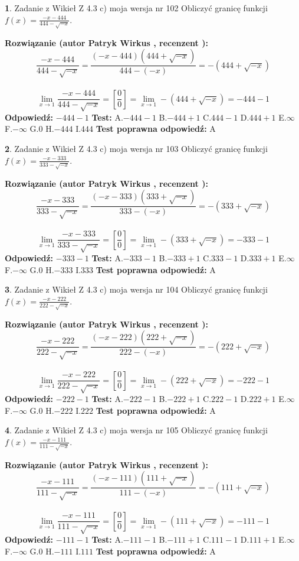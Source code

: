 \documentclass[12pt, a4paper]{article}
\theoremstyle{definition} %
\newtheorem{zad}{}
\newcommand{\zadStart}[1]{\begin{zad}#1\newline}
\newcommand{\zadStop}{\end{zad}}
\newcommand{\rozwStart}[2]{\noindent \textbf{Rozwiązanie (autor #1 , recenzent #2): }\newline}
\newcommand{\rozwStop}{\newline}
\newcommand{\odpStart}{\noindent \textbf{Odpowiedź:}\newline}
\newcommand{\odpStop}{\newline}
\newcommand{\testStart}{\noindent \textbf{Test:}\newline}
\newcommand{\testStop}{\newline}
\newcommand{\kluczStart}{\noindent \textbf{Test poprawna odpowiedź:}\newline}
\newcommand{\kluczStop}{\newline}
\begin{document}
\zadStart{Zadanie z Wikieł Z 4.3 c) moja wersja nr 102}
Obliczyć granicę funkcji $f(x)=\frac{-x-444}{444-\sqrt{-x}}$.
\zadStop
\rozwStart{Patryk Wirkus}{}
$$\frac{-x-444}{444-\sqrt{-x}}=\frac{(-x-444)(444+\sqrt{-x})}{444-(-x)}=-(444+\sqrt{-x})$$
\\
$$\lim\limits_{x\to1}\frac{-x-444}{444-\sqrt{-x}}=[\frac{0}{0}]=\lim\limits_{x\to1}-(444+\sqrt{-x}) =-444-1$$
\rozwStop
\odpStart
$-444-1$
\odpStop
\testStart
A.$-444-1$
B.$-444+1$
C.$444-1$
D.$444+1$
E.$\infty$
F.$-\infty$
G.$0$
H.$-444$
I.$444$
\testStop
\kluczStart
A
\kluczStop



\zadStart{Zadanie z Wikieł Z 4.3 c) moja wersja nr 103}
Obliczyć granicę funkcji $f(x)=\frac{-x-333}{333-\sqrt{-x}}$.
\zadStop
\rozwStart{Patryk Wirkus}{}
$$\frac{-x-333}{333-\sqrt{-x}}=\frac{(-x-333)(333+\sqrt{-x})}{333-(-x)}=-(333+\sqrt{-x})$$
\\
$$\lim\limits_{x\to1}\frac{-x-333}{333-\sqrt{-x}}=[\frac{0}{0}]=\lim\limits_{x\to1}-(333+\sqrt{-x}) =-333-1$$
\rozwStop
\odpStart
$-333-1$
\odpStop
\testStart
A.$-333-1$
B.$-333+1$
C.$333-1$
D.$333+1$
E.$\infty$
F.$-\infty$
G.$0$
H.$-333$
I.$333$
\testStop
\kluczStart
A
\kluczStop



\zadStart{Zadanie z Wikieł Z 4.3 c) moja wersja nr 104}
Obliczyć granicę funkcji $f(x)=\frac{-x-222}{222-\sqrt{-x}}$.
\zadStop
\rozwStart{Patryk Wirkus}{}
$$\frac{-x-222}{222-\sqrt{-x}}=\frac{(-x-222)(222+\sqrt{-x})}{222-(-x)}=-(222+\sqrt{-x})$$
\\
$$\lim\limits_{x\to1}\frac{-x-222}{222-\sqrt{-x}}=[\frac{0}{0}]=\lim\limits_{x\to1}-(222+\sqrt{-x}) =-222-1$$
\rozwStop
\odpStart
$-222-1$
\odpStop
\testStart
A.$-222-1$
B.$-222+1$
C.$222-1$
D.$222+1$
E.$\infty$
F.$-\infty$
G.$0$
H.$-222$
I.$222$
\testStop
\kluczStart
A
\kluczStop



\zadStart{Zadanie z Wikieł Z 4.3 c) moja wersja nr 105}
Obliczyć granicę funkcji $f(x)=\frac{-x-111}{111-\sqrt{-x}}$.
\zadStop
\rozwStart{Patryk Wirkus}{}
$$\frac{-x-111}{111-\sqrt{-x}}=\frac{(-x-111)(111+\sqrt{-x})}{111-(-x)}=-(111+\sqrt{-x})$$
\\
$$\lim\limits_{x\to1}\frac{-x-111}{111-\sqrt{-x}}=[\frac{0}{0}]=\lim\limits_{x\to1}-(111+\sqrt{-x}) =-111-1$$
\rozwStop
\odpStart
$-111-1$
\odpStop
\testStart
A.$-111-1$
B.$-111+1$
C.$111-1$
D.$111+1$
E.$\infty$
F.$-\infty$
G.$0$
H.$-111$
I.$111$
\testStop
\kluczStart
A
\kluczStop
\end{document}
